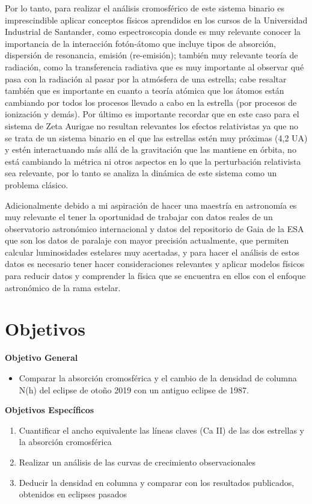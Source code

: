 \documentclass[11pt]{article}
\begin{document}
Por lo tanto, para realizar el análisis cromosférico de este sistema binario es imprescindible aplicar conceptos físicos aprendidos en los cursos de la Universidad Industrial de Santander, como espectroscopia donde es muy relevante conocer la importancia de la interacción fotón-átomo que incluye tipos de absorción, dispersión de resonancia, emisión (re-emisión); también muy relevante teoría de radiación, como la transferencia radiativa que es muy importante al observar qué pasa con la radiación al pasar por la atmósfera de una estrella; cabe resaltar también que es importante en cuanto a teoría atómica que los átomos están cambiando por todos los procesos llevado a cabo en la estrella (por procesos de ionización y demás). Por último es importante recordar que en este caso para el sistema de Zeta Aurigae no resultan relevantes los efectos relativistas ya que no se trata de un sistema binario en el que las estrellas estén muy próximas (4,2 UA) y estén interactuando más allá de la gravitación que las mantiene en órbita, no está cambiando la métrica ni otros aspectos en lo que la perturbación relativista sea relevante, por lo tanto se analiza la dinámica de este sistema como un problema clásico.

\noindent Adicionalmente debido a mi aspiración de hacer una maestría en astronomía es muy relevante el tener la oportunidad de trabajar con datos reales de un observatorio astronómico internacional y datos del repositorio de Gaia de la ESA que son los datos de paralaje con mayor precisión actualmente, que permiten calcular luminosidades estelares muy acertadas, y para hacer el análisis de estos datos es necesario tener hacer consideraciones relevantes y aplicar modelos físicos para reducir datos y comprender la física que se encuentra en ellos con el enfoque astronómico de la rama estelar.

\section{Objetivos}

\textbf{Objetivo General}

\begin{itemize}
\item Comparar la absorción cromosférica y el cambio de la densidad de columna N(h) del eclipse de otoño 2019 con un antiguo eclipse de 1987.
\end{itemize}
\textbf{Objetivos Espec\'ificos}
\begin{enumerate}
    \item Cuantificar el ancho equivalente las líneas claves (Ca II) de las dos estrellas y la  absorción cromosférica

    \item Realizar un análisis de las curvas de crecimiento observacionales

    \item Deducir la densidad en columna y comparar con los resultados publicados, obtenidos en eclipses pasados
\end{enumerate}
\end{document}
